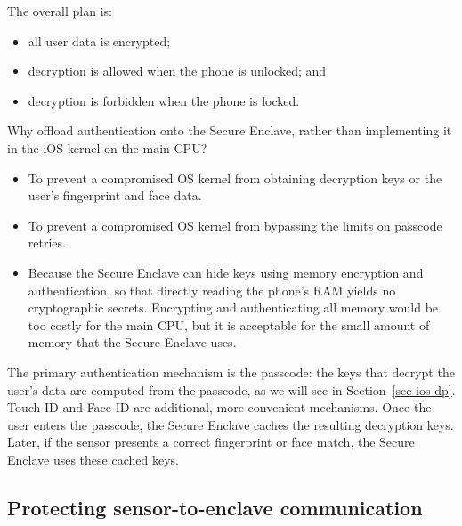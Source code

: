 \documentclass[
  letterpaper,
]{scrbook}
\providecommand{\tightlist}{%
  \setlength{\itemsep}{0pt}\setlength{\parskip}{0pt}}
\theoremstyle{definition}
\theoremstyle{plain}
\theoremstyle{plain}
\theoremstyle{remark}
\begin{document}
The overall plan is:

\begin{itemize}
\tightlist
\item
  all user data is encrypted;
\item
  decryption is allowed when the phone is unlocked; and
\item
  decryption is forbidden when the phone is locked.
\end{itemize}

Why offload authentication onto the Secure Enclave, rather than
implementing it in the iOS kernel on the main CPU?

\begin{itemize}
\tightlist
\item
  To prevent a compromised OS kernel from obtaining decryption keys or
  the user's fingerprint and face data.
\item
  To prevent a compromised OS kernel from bypassing the limits on
  passcode retries.
\item
  Because the Secure Enclave can hide keys using memory encryption and
  authentication, so that directly reading the phone's RAM yields no
  cryptographic secrets. Encrypting and authenticating all memory would
  be too costly for the main CPU, but it is acceptable for the small
  amount of memory that the Secure Enclave uses.
\end{itemize}

The primary authentication mechanism is the passcode: the keys that
decrypt the user's data are computed from the passcode, as we will see
in Section~\ref{sec-ios-dp}. Touch ID and Face ID are additional, more
convenient mechanisms. Once the user enters the passcode, the Secure
Enclave caches the resulting decryption keys. Later, if the sensor
presents a correct fingerprint or face match, the Secure Enclave uses
these cached keys.


\subsection{Protecting sensor-to-enclave
communication}\label{protecting-sensor-to-enclave-communication}
\end{document}
